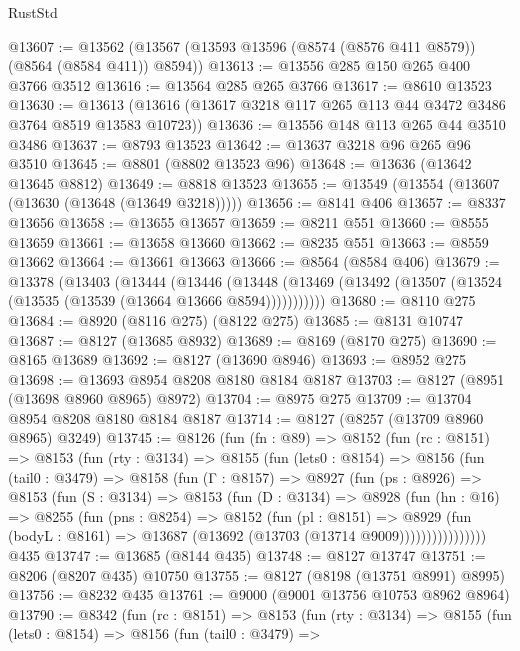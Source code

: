 \begin{lexlean}{RustStd}
\begin{coremodule}
@13607 := @13562 (@13567 (@13593 @13596 (@8574 (@8576 @411 @8579)) (@8564 (@8584 @411)) @8594))
@13613 := @13556 @285 @150 @265 @400 @3766 @3512
@13616 := @13564 @285 @265 @3766
@13617 := @8610 @13523
@13630 := @13613 (@13616 (@13617 @3218 @117 @265 @113 @44 @3472 @3486 @3764 @8519 @13583 @10723))
@13636 := @13556 @148 @113 @265 @44 @3510 @3486
@13637 := @8793 @13523
@13642 := @13637 @3218 @96 @265 @96 @3510
@13645 := @8801 (@8802 @13523 @96)
@13648 := @13636 (@13642 @13645 @8812)
@13649 := @8818 @13523
@13655 := @13549 (@13554 (@13607 (@13630 (@13648 (@13649 @3218)))))
@13656 := @8141 @406
@13657 := @8337 @13656
@13658 := @13655 @13657
@13659 := @8211 @551
@13660 := @8555 @13659
@13661 := @13658 @13660
@13662 := @8235 @551
@13663 := @8559 @13662
@13664 := @13661 @13663
@13666 := @8564 (@8584 @406)
@13679 := @13378
    (@13403
      (@13444
        (@13446
          (@13448 (@13469 (@13492 (@13507 (@13524 (@13535 (@13539 (@13664 @13666 @8594)))))))))))
@13680 := @8110 @275
@13684 := @8920 (@8116 @275) (@8122 @275)
@13685 := @8131 @10747
@13687 := @8127 (@13685 @8932)
@13689 := @8169 (@8170 @275)
@13690 := @8165 @13689
@13692 := @8127 (@13690 @8946)
@13693 := @8952 @275
@13698 := @13693 @8954 @8208 @8180 @8184 @8187
@13703 := @8127 (@8951 (@13698 @8960 @8965) @8972)
@13704 := @8975 @275
@13709 := @13704 @8954 @8208 @8180 @8184 @8187
@13714 := @8127 (@8257 (@13709 @8960 @8965) @3249)
@13745 := @8126
    (fun (fn : @89) =>
    @8152
      (fun (rc : @8151) =>
      @8153
        (fun (rty : @3134) =>
        @8155
          (fun (lets0 : @8154) =>
          @8156
            (fun (tail0 : @3479) =>
            @8158
              (fun (Γ : @8157) =>
              @8927
                (fun (ps : @8926) =>
                @8153
                  (fun (S : @3134) =>
                  @8153
                    (fun (D : @3134) =>
                    @8928
                      (fun (hn : @16) =>
                      @8255
                        (fun (pns : @8254) =>
                        @8152
                          (fun (pl : @8151) =>
                          @8929
                            (fun (bodyL : @8161) =>
                            @13687 (@13692 (@13703 (@13714 @9009))))))))))))))))
    @435
@13747 := @13685 (@8144 @435)
@13748 := @8127 @13747
@13751 := @8206 (@8207 @435) @10750
@13755 := @8127 (@8198 (@13751 @8991) @8995)
@13756 := @8232 @435
@13761 := @9000 (@9001 @13756 @10753 @8962 @8964)
@13790 := @8342
    (fun (rc : @8151) =>
    @8153
      (fun (rty : @3134) =>
      @8155
        (fun (lets0 : @8154) =>
        @8156
          (fun (tail0 : @3479) =>

\end{coremodule}
\end{lexlean}

